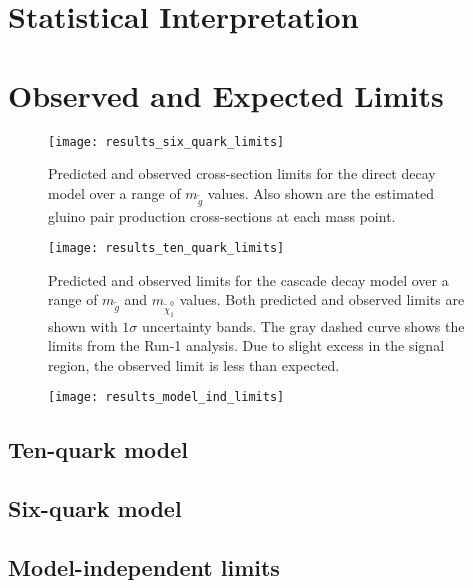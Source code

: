 \section{Statistical Interpretation}\label{sec:results_stats}

\section{Observed and Expected Limits}\label{sec:results_limits}

\begin{figure}[!ht]
    \centering
    \texttt{[image: results\_six\_quark\_limits]}
    \caption{Predicted and observed cross-section limits for the direct decay model over a range of $m_{\tilde{g}}$
    values.
    Also shown are the estimated gluino pair production cross-sections at each mass point.}
\label{fig:results_six_quark_limits}
\end{figure}

\begin{figure}[!ht]
    \centering
    \texttt{[image: results\_ten\_quark\_limits]}
    \caption{Predicted and observed limits for the cascade decay model over a range of $m_{\tilde{g}}$
and $m_{\tilde{\chi}_1^0}$ values.
    Both predicted and observed limits are shown with $1\sigma$ uncertainty bands.
    The gray dashed curve shows the limits from the Run-1 analysis.
    Due to slight excess in the signal region, the observed limit is less than expected.}
\label{fig:results_ten_quark_limits}
\end{figure}

\begin{figure}[!ht]
    \centering
    \texttt{[image: results\_model\_ind\_limits]}
    \caption{}
\label{fig:results_model_ind_limits}
\end{figure}

\subsection{Ten-quark model}\label{subsec:results_limits_ten_quark}
\subsection{Six-quark model}\label{subsec:results_limits_six_quark}
\subsection{Model-independent limits}\label{subsec:results_limits_model_independent}